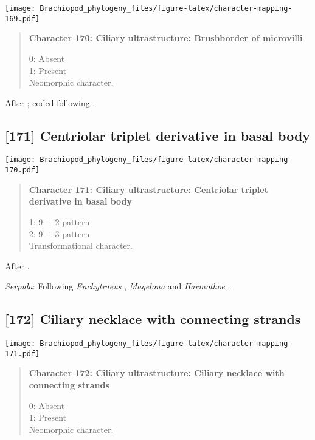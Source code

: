 \documentclass[openany]{book}
\theoremstyle{definition}
\theoremstyle{definition}
\theoremstyle{definition}
\theoremstyle{remark}
\begin{document}
\texttt{[image: Brachiopod\_phylogeny\_files/figure-latex/character-mapping-169.pdf]}

\begin{quote}
\textbf{Character 170: Ciliary ultrastructure: Brushborder of
microvilli}

0: Absent\\
1: Present\\
Neomorphic character.
\end{quote}

After \citet{Lundin2009}; coded following \citet{Smith2012}.

\subsection*{{[}171{]} Centriolar triplet derivative in basal
body}\label{centriolar-triplet-derivative-in-basal-body}

\texttt{[image: Brachiopod\_phylogeny\_files/figure-latex/character-mapping-170.pdf]}

\begin{quote}
\textbf{Character 171: Ciliary ultrastructure: Centriolar triplet
derivative in basal body}

1: 9 + 2 pattern\\
2: 9 + 3 pattern\\
Transformational character.
\end{quote}

After \citet{Lundin2009}.

\hypertarget{Serpula-coding-171}{}
\emph{Serpula}: Following \emph{Enchytraeus} \citep{Reger1967},
\emph{Magelona} \citep{Bartolomaeus1995} and \emph{Harmothoe}
\citep{Holborow1969}.

\subsection*{{[}172{]} Ciliary necklace with connecting
strands}\label{ciliary-necklace-with-connecting-strands}

\texttt{[image: Brachiopod\_phylogeny\_files/figure-latex/character-mapping-171.pdf]}

\begin{quote}
\textbf{Character 172: Ciliary ultrastructure: Ciliary necklace with
connecting strands}

0: Absent\\
1: Present\\
Neomorphic character.
\end{quote}
\end{document}
